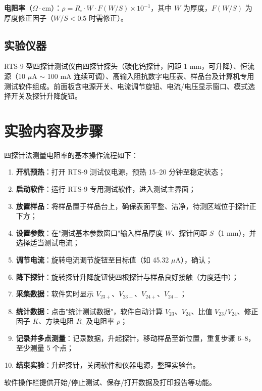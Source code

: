 \textbf{电阻率}（$\Omega \cdot \text{cm}$）：$\rho = R_{\square} \cdot W \cdot F(W/S) \times 10^{-1}$，其中 $W$ 为厚度，$F(W/S)$ 为厚度修正因子（$W/S < 0.5$ 时需修正）。

\subsection{实验仪器}

RTS-9 型四探针测试仪由四探针探头（碳化钨探针，间距 1 mm，可升降）、恒流源（10 $\mu$A $\sim$ 100 mA 连续可调）、高输入阻抗数字电压表、样品台及计算机专用测试软件组成。前面板含电源开关、电流调节旋钮、电流/电压显示窗口、模式选择开关及探针升降旋钮。

\section{实验内容及步骤}

四探针法测量电阻率的基本操作流程如下：

\begin{enumerate}[label=\arabic*、, leftmargin=4em, labelsep=0pt]
    \item \textbf{开机预热}：打开 RTS-9 测试仪电源，预热 15--20 分钟至稳定状态；
    \item \textbf{启动软件}：运行 RTS-9 专用测试软件，进入测试主界面；
    \item \textbf{放置样品}：将样品置于样品台上，确保表面平整、洁净，待测区域位于探针正下方；
    \item \textbf{设置参数}：在"测试基本参数窗口"输入样品厚度 $W$、探针间距 $S$（1 mm），并选择适当测试电流；
    \item \textbf{调节电流}：旋转电流调节旋钮至目标值（如 45.32 $\mu$A），确认；
    \item \textbf{降下探针}：旋转探针升降旋钮使四根探针与样品良好接触（力度适中）；
    \item \textbf{采集数据}：软件实时显示 $V_{23+}$、$V_{23-}$、$V_{24+}$、$V_{24-}$；
    \item \textbf{统计数据}：点击"统计测试数据"，软件自动计算 $V_{23}$、$V_{24}$、比值 $V_{23}/V_{24}$、修正因子 $K$、方块电阻 $R_{\square}$ 及电阻率 $\rho$；
    \item \textbf{记录并多点测量}：记录数据，升起探针，移动样品至新位置，重复步骤 6--8，至少测量 5 个点；
    \item \textbf{结束实验}：升起探针，关闭软件和仪器电源，整理实验台。
\end{enumerate}

软件操作栏提供开始/停止测试、保存/打开数据及打印报告等功能。

